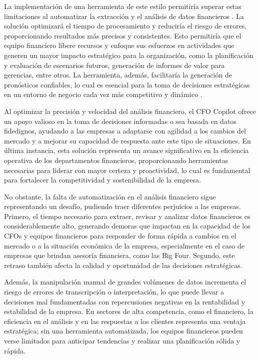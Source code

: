 \documentclass[12pt,letterpaper,oneside]{report}
\renewcommand{\_}{\UnderscoreOriginal\allowbreak}
\begin{document}
La implementación de una herramienta de este estilo permitiría superar estas limitaciones al automatizar la extracción y el análisis de datos financieros \parencite{OlakunleBabatundeA2024}. La solución optimizará el tiempo de procesamiento y reduciría el riesgo de errores, proporcionando resultados más precisos y consistentes. Esto permitiría que el equipo financiero libere recursos y enfoque sus esfuerzos en actividades que generen un mayor impacto estratégico para la organización, como la planificación y evaluación de escenarios futuros, generación de informes de valor para gerencias, entre otros. La herramienta, además, facilitaría la generación de pronósticos confiables, lo cual es esencial para la toma de decisiones estratégicas en un entorno de negocio cada vez más competitivo y dinámico \parencite{Che2024}.

Al optimizar la precisión y velocidad del análisis financiero, el CFO Copilot ofrece un apoyo valioso en la toma de decisiones informadas o sea basada en datos fidedignos, ayudando a las empresas a adaptarse con agilidad a los cambios del mercado y a mejorar su capacidad de respuesta ante este tipo de situaciones. En última instancia, esta solución representa un avance significativo en la eficiencia operativa de los departamentos financieros, proporcionando herramientas necesarias para liderar con mayor certeza y proactividad, lo cual es fundamental para fortalecer la competitividad y sostenibilidad de la empresa. \parencite{Adeyeri2024}

No obstante, la falta de automatización en el análisis financiero sigue representando un desafío, pudiendo traer diferentes perjuicios a las empresas. Primero, el tiempo necesario para extraer, revisar y analizar datos financieros es considerablemente alto, generando demoras que impactan en la capacidad de los CFOs y equipos financieros para responder de forma rápida a cambios en el mercado o a la situación económica de la empresa, especialmente en el caso de empresas que brindan asesoría financiera, como las Big Four. Segundo, este retraso también afecta la calidad y oportunidad de las decisiones estratégicas. \parencite{Ionix2024}

Además, la manipulación manual de grandes volúmenes de datos incrementa el riesgo de errores de transcripción o interpretación, lo que puede llevar a decisiones mal fundamentadas con repercusiones negativas en la rentabilidad y estabilidad de la empresa. En sectores de alta competencia, como el financiero, la eficiencia en el análisis y en las respuestas a los clientes representa una ventaja estratégica; sin una herramienta automatizada, los equipos financieros pueden verse limitados para anticipar tendencias y realizar una planificación sólida y rápida. \parencite{Navarro2024}
\end{document}
